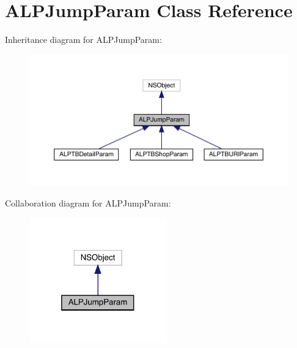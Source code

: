 \hypertarget{interface_a_l_p_jump_param}{}\section{A\+L\+P\+Jump\+Param Class Reference}
\label{interface_a_l_p_jump_param}


Inheritance diagram for A\+L\+P\+Jump\+Param\+:\nopagebreak
\begin{figure}[H]
\begin{center}
\leavevmode
\includegraphics[width=350pt]{interface_a_l_p_jump_param__inherit__graph}
\end{center}
\end{figure}


Collaboration diagram for A\+L\+P\+Jump\+Param\+:\nopagebreak
\begin{figure}[H]
\begin{center}
\leavevmode
\includegraphics[width=169pt]{interface_a_l_p_jump_param__coll__graph}
\end{center}
\end{figure}
